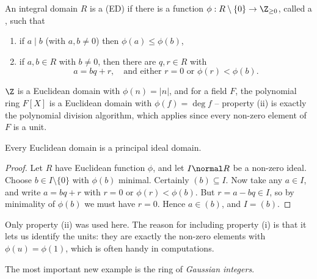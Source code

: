 \begin{definition}
	An integral domain $R$ is a  (ED) if there is a function $\phi: R \setminus \{0\} \rightarrow \Z_{\geq 0}$, called a , such that
	\begin{enumerate}[label=(\roman*)]
		\item if $a \mid b$ (with $a,b \neq 0$) then $\phi(a) \leq \phi(b)$,
		\item if $a, b \in R$ with $b \neq 0$, then there are $q, r \in R$ with
		$$
		a = bq + r, \quad \text{and either } r = 0 \text{ or } \phi(r) < \phi(b).
		$$
	\end{enumerate}
\end{definition}

\begin{example}
	$\Z$ is a Euclidean domain with $\phi(n) = |n|$, and for a field $F$, the polynomial ring $F[X]$ is a Euclidean domain with $\phi(f) = \deg f$ -- property (ii) is exactly the polynomial division algorithm, which applies since every non-zero element of $F$ is a unit.
\end{example}

\begin{proposition}
	Every Euclidean domain is a principal ideal domain.
\end{proposition}
\begin{proof}
	Let $R$ have Euclidean function $\phi$, and let $I \normal R$ be a non-zero ideal. Choose $b \in I \setminus \{0\}$ with $\phi(b)$ minimal. Certainly $(b) \subseteq I$. Now take any $a \in I$, and write $a = bq + r$ with $r = 0$ or $\phi(r) < \phi(b)$. But $r = a - bq \in I$, so by minimality of $\phi(b)$ we must have $r = 0$. Hence $a \in (b)$, and $I = (b)$.
\end{proof}

\begin{remark}
	Only property (ii) was used here. The reason for including property (i) is that it lets us identify the units: they are exactly the non-zero elements with $\phi(u) = \phi(1)$, which is often handy in computations.
\end{remark}

The most important new example is the ring of \emph{Gaussian integers}.

